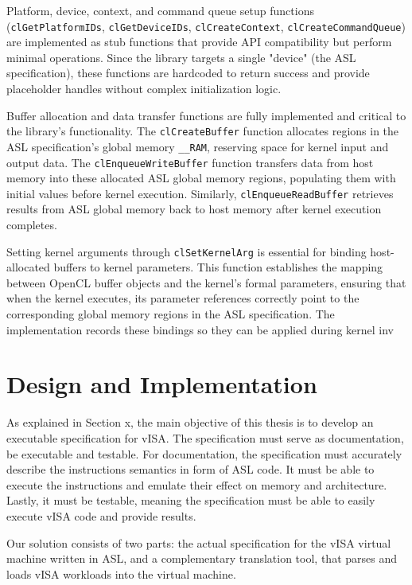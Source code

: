 Platform, device, context, and command queue setup functions
(\texttt{clGetPlatformIDs}, \texttt{clGetDeviceIDs}, \texttt{clCreateContext},
\texttt{clCreateCommandQueue}) are implemented as stub functions that provide
API compatibility but perform minimal operations. Since the library targets a
single "device" (the ASL specification), these functions are hardcoded to
return success and provide placeholder handles without complex initialization
logic.

Buffer allocation and data transfer functions are fully implemented and
critical to the library's functionality. The \texttt{clCreateBuffer} function
allocates regions in the ASL specification's global memory \lstinline{__RAM},
reserving space for kernel input and output data. The
\texttt{clEnqueueWriteBuffer} function transfers data from host memory into
these allocated ASL global memory regions, populating them with initial values
before kernel execution. Similarly, \texttt{clEnqueueReadBuffer} retrieves
results from ASL global memory back to host memory after kernel execution
completes.

Setting kernel arguments through \texttt{clSetKernelArg} is essential for
binding host-allocated buffers to kernel parameters. This function establishes
the mapping between OpenCL buffer objects and the kernel's formal parameters,
ensuring that when the kernel executes, its parameter references correctly
point to the corresponding global memory regions in the ASL specification. The
implementation records these bindings so they can be applied during kernel inv



\chapter{Design and Implementation}

As explained in Section x, the main objective of this thesis is to develop an
executable specification for vISA. The specification must serve as
documentation, be executable and testable. For documentation, the specification
must accurately describe the instructions semantics in form of ASL code. It
must be able to execute the instructions and emulate their effect on memory and
architecture. Lastly, it must be testable, meaning the specification must be
able to easily execute vISA code and provide results.

Our solution consists of two parts: the actual specification for the vISA
virtual machine written in ASL, and a complementary translation tool, that
parses and loads vISA workloads into the virtual machine.

